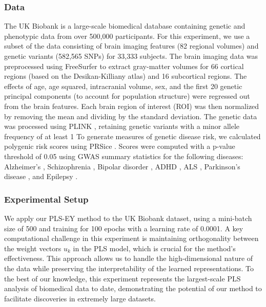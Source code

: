 \subsubsection{Data}
The UK Biobank is a large-scale biomedical database containing genetic and phenotypic data from over 500,000 participants. For this experiment, we use a subset of the data consisting of brain imaging features (82 regional volumes) and genetic variants (582,565 SNPs) for 33,333 subjects.
The brain imaging data was preprocessed using FreeSurfer \citep{Fischl2012} to extract gray-matter volumes for 66 cortical regions (based on the Desikan-Killiany atlas) and 16 subcortical regions. The effects of age, age squared, intracranial volume, sex, and the first 20 genetic principal components (to account for population structure) were regressed out from the brain features. Each brain region of interest (ROI) was then normalized by removing the mean and dividing by the standard deviation.
The genetic data was processed using PLINK \citep{Purcell2007}, retaining genetic variants with a minor allele frequency of at least 1%
To generate measures of genetic disease risk, we calculated polygenic risk scores using PRSice \citep{PRSice2014}. Scores were computed with a p-value threshold of 0.05 using GWAS summary statistics for the following diseases: Alzheimer's \citep{Lambert2013}, Schizophrenia \citep{Trubetskoy2022}, Bipolar disorder \citep{Mullins2021}, ADHD \citep{Demontis2023}, ALS \citep{Van_Rheenen2021}, Parkinson's disease \citep{Nalls2019}, and Epilepsy \citep{International_League_Against_Epilepsy_Consortium_on_Complex_Epilepsies2018}.
\subsubsection{Experimental Setup}
We apply our PLS-EY method to the UK Biobank dataset, using a mini-batch size of 500 and training for 100 epochs with a learning rate of 0.0001. A key computational challenge in this experiment is maintaining orthogonality between the weight vectors $u_k$ in the PLS model, which is crucial for the method's effectiveness.
This approach allows us to handle the high-dimensional nature of the data while preserving the interpretability of the learned representations. To the best of our knowledge, this experiment represents the largest-scale PLS analysis of biomedical data to date, demonstrating the potential of our method to facilitate discoveries in extremely large datasets.
